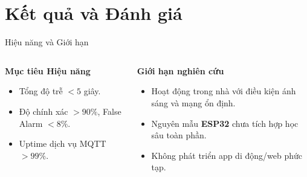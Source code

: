 \section{Kết quả và Đánh giá}
\begin{frame}{Hiệu năng và Giới hạn}
    \begin{columns}[T]
        \begin{column}{0.48\textwidth}
            \textbf{Mục tiêu Hiệu năng}
            \begin{itemize}
                \item Tổng độ trễ $<5$ giây.
                \item Độ chính xác $>90\%$, False Alarm $<8\%$.
                \item Uptime dịch vụ MQTT $>99\%$.
            \end{itemize}
        \end{column}
        \begin{column}{0.48\textwidth}
            \textbf{Giới hạn nghiên cứu}
            \begin{itemize}
                \item Hoạt động trong nhà với điều kiện ánh sáng và mạng ổn định.
                \item Nguyên mẫu \textbf{ESP32} chưa tích hợp học sâu toàn phần.
                \item Không phát triển app di động/web phức tạp.
            \end{itemize}
        \end{column}
    \end{columns}
\end{frame}

